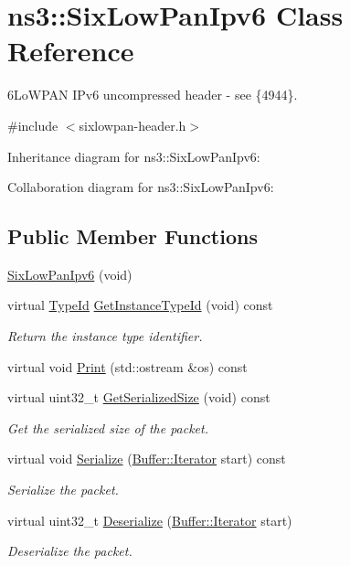 \hypertarget{classns3_1_1SixLowPanIpv6}{}\section{ns3\+:\+:Six\+Low\+Pan\+Ipv6 Class Reference}
\label{classns3_1_1SixLowPanIpv6}


6\+Lo\+W\+P\+AN I\+Pv6 uncompressed header -\/ see \{4944\}.  




{\ttfamily \#include $<$sixlowpan-\/header.\+h$>$}



Inheritance diagram for ns3\+:\+:Six\+Low\+Pan\+Ipv6\+:


Collaboration diagram for ns3\+:\+:Six\+Low\+Pan\+Ipv6\+:
\subsection*{Public Member Functions}
\begin{DoxyCompactItemize}
\item 
\hyperlink{classns3_1_1SixLowPanIpv6_ad81179fa06411f98c14d1f86e46d6168}{Six\+Low\+Pan\+Ipv6} (void)
\item 
virtual \hyperlink{classns3_1_1TypeId}{Type\+Id} \hyperlink{classns3_1_1SixLowPanIpv6_ae02012b9137b4d9b1f6e1802f1ec8aa4}{Get\+Instance\+Type\+Id} (void) const 
\begin{DoxyCompactList}\small\item\em Return the instance type identifier. \end{DoxyCompactList}\item 
virtual void \hyperlink{classns3_1_1SixLowPanIpv6_a63bb6877814c9400b1ba182e16b21ed6}{Print} (std\+::ostream \&os) const 
\item 
virtual uint32\+\_\+t \hyperlink{classns3_1_1SixLowPanIpv6_a7179c5c3cb54cbda59a28cd1ed466754}{Get\+Serialized\+Size} (void) const 
\begin{DoxyCompactList}\small\item\em Get the serialized size of the packet. \end{DoxyCompactList}\item 
virtual void \hyperlink{classns3_1_1SixLowPanIpv6_a7e510c91916f50f29d1b9d9625da211f}{Serialize} (\hyperlink{classns3_1_1Buffer_1_1Iterator}{Buffer\+::\+Iterator} start) const 
\begin{DoxyCompactList}\small\item\em Serialize the packet. \end{DoxyCompactList}\item 
virtual uint32\+\_\+t \hyperlink{classns3_1_1SixLowPanIpv6_aafa242cd070180d3b35a9de6656d4ef6}{Deserialize} (\hyperlink{classns3_1_1Buffer_1_1Iterator}{Buffer\+::\+Iterator} start)
\begin{DoxyCompactList}\small\item\em Deserialize the packet. \end{DoxyCompactList}\end{DoxyCompactItemize}
